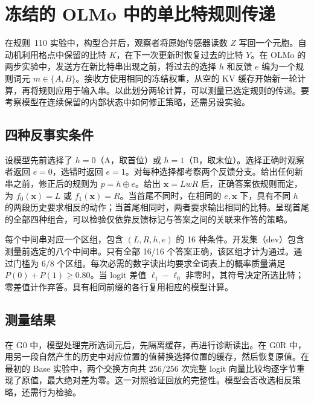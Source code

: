 \section{冻结的 OLMo 中的单比特规则传递}
\label{sec:olmo}
在规则~110 实验中，构型合并后，观察者将原始传感器读数 $Z$ 写回一个元胞。自动机利用格点中保留的比特 $K$，在下一次更新时恢复过去的比特 $Y$。在 OLMo 的两步实验中，发送方在新比特串出现之前，将过去的选择 $h$ 和反馈 $e$ 编为一个规则词元 $m\in\{A,B\}$。接收方使用相同的冻结权重，从空的 KV 缓存开始新一轮计算，再将规则应用于输入串。以此划分两轮计算，可以测量已选定规则的传递。要考察模型在连续保留的内部状态中如何修正策略，还需另设实验。

\subsection{四种反事实条件}
设模型先前选择了 $h=0$（A，取首位）或 $h=1$（B，取末位）。选择正确时观察者返回 $e=0$，选错时返回 $e=1$。对每种选择都考察两个反馈分支。给出任何新串之前，修正后的规则为 $p=h\oplus e$。给出 $\mathbf{x}=LwR$ 后，正确答案依规则而定，为 $f_0(\mathbf{x})=L$ 或 $f_1(\mathbf{x})=R$。当首尾不同时，在相同的 $e,\mathbf{x}$ 下，具有不同 $h$ 的两段历史要求相反的动作；当首尾相同时，两者要求输出相同的比特。呈现首尾的全部四种组合，可以检验仅依靠反馈标记与答案之间的关联来作答的策略。

每个中间串对应一个区组，包含 $(L,R,h,e)$ 的 16 种条件。开发集（dev）包含测量前选定的八个中间串。只有全部 16/16 个答案正确，该区组才计为通过。通过门槛为 6/8 个区组。每次必需的数字读出均要求全词表上的概率质量满足 $P(0)+P(1)\ge0.80$。当 logit 差值 $\ell_1-\ell_0$ 非零时，其符号决定所选比特；零差值计作弃答。具有相同前缀的各行复用相应的模型计算。

\subsection{测量结果}
在 G0 中，模型处理完所选词元后，先隔离缓存，再进行诊断读出。在 G0R 中，用另一段自然产生的历史中对应位置的值替换选择位置的缓存，然后恢复原值。在最初的 Base 实验中，两个交换方向共 256/256 次完整 logit 向量比较均逐字节重现了原值，最大绝对差为零。这一对照验证回放的完整性。模型会否改选相反策略，还需行为检验。

